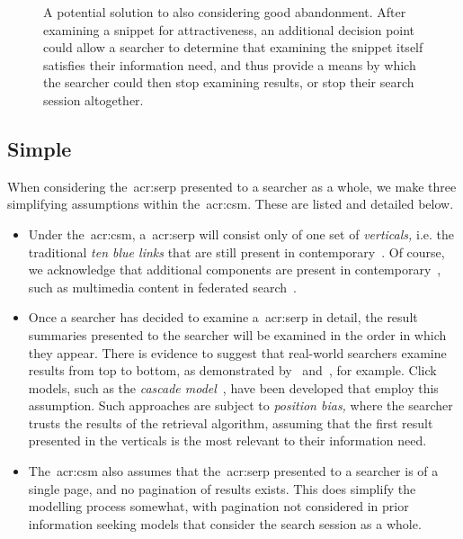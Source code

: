 \begin{figure}[t!]
    \centering
    \caption[Flowchart considering good abandonment]{A potential solution to also considering good abandonment. After examining a snippet for attractiveness, an additional decision point could allow a searcher to determine that examining the snippet itself satisfies their information need, and thus provide a means by which the searcher could then stop examining results, or stop their search session altogether.}
    \label{fig:csm_bad_good}
\end{figure}

\subsection{Simple~} When considering the~\gls{acr:serp} presented to a searcher as a whole, we make three simplifying assumptions within the~\gls{acr:csm}. These are listed and detailed below.

\begin{itemize}
    \item{ Under the~\gls{acr:csm}, a~\gls{acr:serp} will consist only of one set of \emph{verticals,} i.e. the traditional \emph{ten blue links} that are still present in contemporary~. Of course, we acknowledge that additional components are present in contemporary~, such as multimedia content in federated search~\citep{chen2012federated_search_click_model}.}
    \item{ Once a searcher has decided to examine a~\gls{acr:serp} in detail, the result summaries presented to the searcher will be examined in the order in which they appear. There is evidence to suggest that real-world searchers examine results from top to bottom, as demonstrated by~\cite{joachims2002click_model} and~\cite{joachims2005click_model}, for example. Click models, such as the \emph{cascade model}~\citep{craswell2008click_models}, have been developed that employ this assumption. Such approaches are subject to \emph{position bias,} where the searcher trusts the results of the retrieval algorithm, assuming that the first result presented in the verticals is the most relevant to their information need.}
    \item{ The~\gls{acr:csm} also assumes that the~\gls{acr:serp} presented to a searcher is of a single page, and no pagination of results exists. This does simplify the modelling process somewhat, with pagination not considered in prior information seeking models that consider the search session as a whole.}
\end{itemize}

